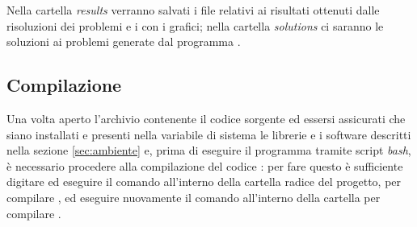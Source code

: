Nella cartella \emph{results} verranno salvati i file relativi ai risultati ottenuti dalle risoluzioni dei problemi e i  con i grafici; nella cartella \emph{solutions} ci saranno le soluzioni ai problemi generate dal programma .

\subsection{Compilazione}
Una volta aperto l'archivio contenente il codice sorgente ed essersi assicurati che siano installati e presenti nella variabile di sistema  le librerie e i software descritti nella sezione \ref{sec:ambiente} e, prima di eseguire il programma tramite script \emph{bash}, è necessario procedere alla compilazione del codice : per fare questo è sufficiente digitare ed eseguire il comando  all'interno della cartella radice del progetto, per compilare , ed eseguire nuovamente il comando  all'interno della cartella  per compilare .

